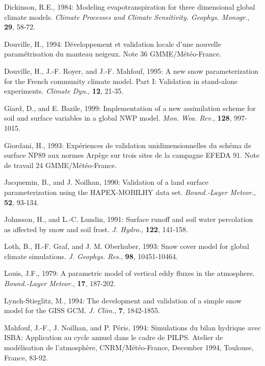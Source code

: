\begin{description}
\item
Dickinson, R.E., 1984:
Modeling evapotranspiration for three dimensional global
climate models.
{\em Climate Processes and Climate Sensitivity.
Geophys. Monogr.},
{\bf 29},
58-72.

\item
Douville, H., 1994:
D\'eveloppement et validation locale d'une nouvelle
param\'etrisation du manteau neigeux.
Note 36 GMME/M\'et\'eo-France.

\item
Douville, H., J.-F. Royer, and J.-F. Mahfouf, 1995:
A new snow parameterization for the French community climate
model.  Part I:  Validation in stand-alone experiments.
{\em Climate Dyn.}, {\bf 12}, 21-35.

\item
Giard, D., and E. Bazile, 1999:
Implementation of a new assimilation scheme for
soil and surface variables in a global NWP model.
{\em Mon. Wea. Rev.}, {\bf 128}, 997-1015.

\item
Giordani, H., 1993:
Exp\'eriences de validation unidimensionnelles du sch\'ema
de surface NP89 aux normes Arp\`ege sur trois sites de la
campagne EFEDA 91.
Note de travail 24 GMME/M\'et\'eo-France.

\item
Jacquemin, B., and J. Noilhan, 1990:
Validation of a land surface parameterization using the
HAPEX-MOBILHY data set.
{\em Bound.-Layer Meteor.},
{\bf 52},
93-134.

\item
Johnsson, H., and L.-C. Lundin, 1991:
Surface runoff and soil water percolation as affected by snow
and soil frost.
{\em J. Hydro.},
{\bf 122},
141-158.

\item
Loth, B.,
H.-F. Graf, and J. M. Oberhuber, 1993:
Snow cover model for global climate simulations.
{\em J. Geophys. Res.},
{\bf 98},
10451-10464.

\item
Louis, J.F., 1979:
A parametric model of vertical eddy fluxes in the atmosphere.
{\em Bound.-Layer Meteor.},
{\bf 17},
187-202.

\item
Lynch-Stieglitz, M., 1994: The development and validation
of a simple snow model for the GISS GCM.
{\em J. Clim.},
{\bf 7},
1842-1855.

\item
Mahfouf, J.-F., J. Noilhan, and P. P\'eris, 1994:
Simulations du bilan hydrique avec ISBA:  Application
au cycle annuel dans le cadre de PILPS.
Atelier de mod\'elisation de l'atmosph\`ere,
CNRM/M\'et\'eo-France,
December 1994, Toulouse, France, 83-92.


\end{description}
